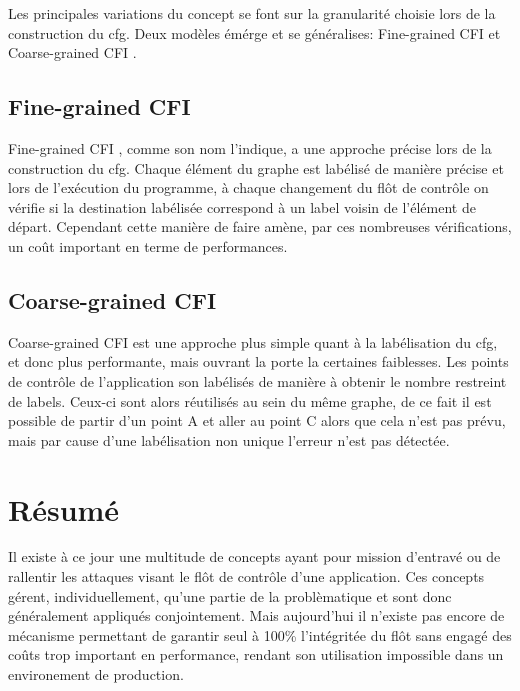 Les principales variations du concept se font sur la granularité choisie lors de la construction du \gls{cfg}. Deux \og modèles \fg émérge et se généralises: \og Fine-grained CFI \fg et \og Coarse-grained CFI \fg.

\subsection{Fine-grained CFI}

\og Fine-grained CFI \fg \cite{FineCFI} \cite{FineCFIKernel}, comme son nom l'indique, a une approche précise lors de la construction du \gls{cfg}. Chaque élément du graphe est labélisé de manière précise et lors de l'exécution du programme, à chaque changement du flôt de contrôle on vérifie si la destination labélisée correspond à un label voisin de l'élément de départ. Cependant cette manière de faire amène, par ces nombreuses vérifications, un coût important en terme de performances.

\subsection{Coarse-grained CFI}

\og Coarse-grained CFI \fg est une approche plus simple quant à la labélisation du \gls{cfg},  et donc plus performante, mais ouvrant la porte la certaines faiblesses. Les points de contrôle de l'application son labélisés de manière à obtenir le nombre restreint de labels. Ceux-ci sont alors réutilisés au sein du même graphe, de ce fait il est possible de partir d'un point A et aller au point C alors que cela n'est pas prévu, mais par cause d'une labélisation non unique l'erreur n'est pas détectée.

\section{Résumé}

Il existe à ce jour une multitude de concepts ayant pour mission d'entravé ou de rallentir les attaques visant le flôt de contrôle d'une application. Ces concepts gérent, individuellement, qu'une partie de la problèmatique et sont donc généralement appliqués conjointement. Mais aujourd'hui il n'existe pas encore de mécanisme permettant de garantir seul à 100\% l'intégritée du flôt sans engagé des coûts trop important en performance, rendant son utilisation impossible dans un environement de production.



